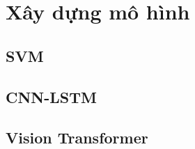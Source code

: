 \section{Xây dựng mô hình}
\label{sec:model}

\subsection{SVM}

\subsection{CNN-LSTM}

\subsection{Vision Transformer}
